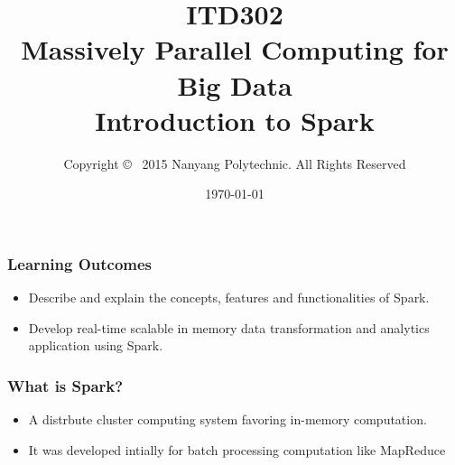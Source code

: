 \documentclass{beamer}
\begin{document}
\lstset{language=python}

\title{ITD302 \\ Massively Parallel Computing for Big Data \\
  Introduction to Spark} 
\author{ \white 
 Copyright \copyright~ 2015 Nanyang Polytechnic. All Rights Reserved
}
\date{\today} 


%

\frame{\titlepage} 



\begin{frame}
\frametitle{Learning Outcomes}

\begin{itemize}
  \item Describe and explain the concepts, features and
    functionalities of Spark.
  \item Develop real-time scalable in memory data transformation and
    analytics application using Spark.
\end{itemize}
\end{frame}


\begin{frame}
\frametitle{What is Spark?}
\begin{itemize}
\item A distrbute cluster computing system favoring in-memory computation. 
\item It was developed intially for batch processing computation like MapReduce
\end{itemize}
\end{frame}
\end{document}
